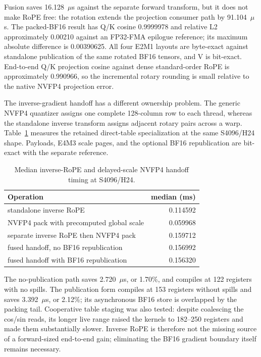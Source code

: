 Fusion saves 16.128~$\mu$s against the separate forward transform, but it
does not make RoPE free: the rotation extends the projection consumer path by
91.104~$\mu$s.  The packed-BF16 result has Q/K cosine 0.9999978 and relative
L2 approximately 0.00210 against an FP32-FMA epilogue reference; its maximum
absolute difference is 0.00390625.  All four E2M1 layouts are byte-exact
against standalone publication of the same rotated BF16 tensors, and V is
bit-exact.  End-to-end Q/K projection cosine against dense standard-order
RoPE is approximately 0.990966, so the incremental rotary rounding is small
relative to the native NVFP4 projection error.

The inverse-gradient handoff has a different ownership problem.  The generic
NVFP4 quantizer assigns one complete 128-column row to each thread, whereas
the standalone inverse transform assigns adjacent rotary pairs across a warp.
Table~\ref{tab:inverse-rope-nvfp4-handoff} measures the retained direct-table
specialization at the same S4096/H24 shape.  Payloads, E4M3 scale pages, and
the optional BF16 republication are bit-exact with the separate reference.

\begin{table}[htbp]
\centering
\caption{Median inverse-RoPE and delayed-scale NVFP4 handoff timing at
S4096/H24.}
\label{tab:inverse-rope-nvfp4-handoff}
\small
\begin{tabular}{l r}
\toprule
Operation & median (ms) \\
\midrule
standalone inverse RoPE & 0.114592 \\
NVFP4 pack with precomputed global scale & 0.059968 \\
separate inverse RoPE then NVFP4 pack & 0.159712 \\
fused handoff, no BF16 republication & 0.156992 \\
fused handoff with BF16 republication & 0.156320 \\
\bottomrule
\end{tabular}
\end{table}

The no-publication path saves 2.720~$\mu$s, or 1.70\%, and compiles at 122
registers with no spills.  The publication form compiles at 153 registers
without spills and saves 3.392~$\mu$s, or 2.12\%; its asynchronous BF16 store
is overlapped by the packing tail.  Cooperative table staging was also
tested: despite coalescing the cos/sin reads, its longer live range raised the
kernels to 182--250 registers and made them substantially slower.  Inverse
RoPE is therefore not the missing source of a forward-sized end-to-end gain;
eliminating the BF16 gradient boundary itself remains necessary.

